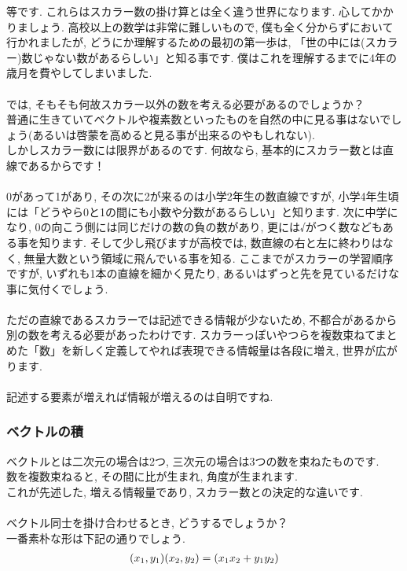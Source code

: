 \documentclass[11pt,a4paper]{jsarticle}
\begin{document}
等です. これらはスカラー数の掛け算とは全く違う世界になります. 心してかかりましょう. 高校以上の数学は非常に難しいもので, 僕も全く分からずにおいて行かれましたが, どうにか理解するための最初の第一歩は, 「世の中には(スカラー)数じゃない数があるらしい」と知る事です. 僕はこれを理解するまでに4年の歳月を費やしてしまいました. \\
\\
では, そもそも何故スカラー以外の数を考える必要があるのでしょうか？\\
普通に生きていてベクトルや複素数といったものを自然の中に見る事はないでしょう(あるいは啓蒙を高めると見る事が出来るのやもしれない).\\
しかしスカラー数には限界があるのです. 何故なら, 基本的にスカラー数とは直線であるからです！ \\
\\
0があって1があり, その次に2が来るのは小学2年生の数直線ですが, 小学4年生頃には「どうやら0と1の間にも小数や分数があるらしい」と知ります. 次に中学になり, 0の向こう側には同じだけの数の負の数があり, 更には√がつく数などもある事を知ります. そして少し飛びますが高校では, 数直線の右と左に終わりはなく, 無量大数という領域に飛んでいる事を知る. ここまでがスカラーの学習順序ですが, いずれも1本の直線を細かく見たり, あるいはずっと先を見ているだけな事に気付くでしょう. \\
\\
ただの直線であるスカラーでは記述できる情報が少ないため, 不都合があるから別の数を考える必要があったわけです. スカラーっぽいやつらを複数束ねてまとめた「数」を新しく定義してやれば表現できる情報量は各段に増え, 世界が広がります. \\
\\
記述する要素が増えれば情報が増えるのは自明ですね.
\\
\subsubsection{ベクトルの積}
ベクトルとは二次元の場合は2つ, 三次元の場合は3つの数を束ねたものです. \\
数を複数束ねると, その間に比が生まれ, 角度が生まれます. \\
これが先述した, 増える情報量であり, スカラー数との決定的な違いです.\\
\\
ベクトル同士を掛け合わせるとき, どうするでしょうか？\\
一番素朴な形は下記の通りでしょう.\\
\begin{eqnarray}
(\mathstrut x_1 , \mathstrut y_1)(\mathstrut x_2 , \mathstrut y_2 ) = (\mathstrut x_1 \mathstrut x_2 + \mathstrut y_1 \mathstrut y_2)
\end{eqnarray}
\end{document}
